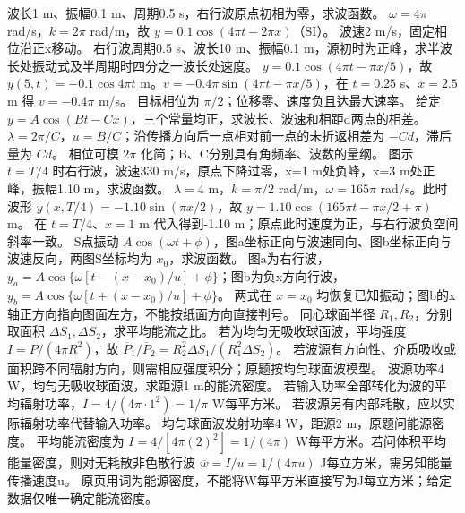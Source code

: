 \problemtext 波长1 m、振幅0.1 m、周期0.5 s，右行波原点初相为零，求波函数。
\workings $\omega=4\pi$ rad/s，$k=2\pi$ rad/m，故 $y=0.1\cos(4\pi t-2\pi x)$（SI）。
\crosscheck 波速2 m/s，固定相位沿正x移动。
\problemtext 右行波周期0.5 s、波长10 m、振幅0.1 m，源初时为正峰，求半波长处振动式及半周期时四分之一波长处速度。
\workings $y=0.1\cos(4\pi t-\pi x/5)$，故 $y(5,t)=-0.1\cos4\pi t$ m。$v=-0.4\pi\sin(4\pi t-\pi x/5)$，在 $t=0.25$ s、$x=2.5$ m 得 $v=-0.4\pi$ m/s。
\crosscheck 目标相位为 $\pi/2$；位移零、速度负且达最大速率。
\problemtext 给定 $y=A\cos(Bt-Cx)$，三个常量均正，求波长、波速和相距d两点的相差。
\workings $\lambda=2\pi/C$，$u=B/C$；沿传播方向后一点相对前一点的未折返相差为 $-Cd$，滞后量为 $Cd$。
\crosscheck 相位可模 $2\pi$ 化简；B、C分别具有角频率、波数的量纲。
\problemtext 图示 $t=T/4$ 时右行波，波速330 m/s，原点下降过零，x=1 m处负峰，x=3 m处正峰，振幅1.10 m，求波函数。
\workings $\lambda=4$ m，$k=\pi/2$ rad/m，$\omega=165\pi$ rad/s。此时波形 $y(x,T/4)=-1.10\sin(\pi x/2)$，故 $y=1.10\cos(165\pi t-\pi x/2+\pi)$ m。
\crosscheck 在 $t=T/4$、$x=1$ m 代入得到-1.10 m；原点此时速度为正，与右行波负空间斜率一致。
\problemtext S点振动 $A\cos(\omega t+\phi)$，图a坐标正向与波速同向、图b坐标正向与波速反向，两图S坐标均为 $x_0$，求波函数。
\workings 图a为右行波，$y_a=A\cos\{\omega[t-(x-x_0)/u]+\phi\}$；图b为负x方向行波，$y_b=A\cos\{\omega[t+(x-x_0)/u]+\phi\}$。
\crosscheck 两式在 $x=x_0$ 均恢复已知振动；图b的x轴正方向指向图面左方，不能按纸面方向直接判号。
\problemtext 同心球面半径 $R_1,R_2$，分别取面积 $\Delta S_1,\Delta S_2$，求平均能流之比。
\workings 若为均匀无吸收球面波，平均强度 $I=P/(4\pi R^2)$，故 $\overline P_1/\overline P_2=R_2^2\Delta S_1/(R_1^2\Delta S_2)$。
\crosscheck 若波源有方向性、介质吸收或面积跨不同辐射方向，则需相应强度积分；原题按均匀球面波模型。
\problemtext 波源功率4 W，均匀无吸收球面波，求距源1 m的能流密度。
\workings 若输入功率全部转化为波的平均辐射功率，$I=4/(4\pi\cdot1^2)=1/\pi$ W每平方米。
\crosscheck 若波源另有内部耗散，应以实际辐射功率代替输入功率。
\problemtext 均匀球面波发射功率4 W，距源2 m，原题问能源密度。
\workings 平均能流密度为 $I=4/[4\pi(2)^2]=1/(4\pi)$ W每平方米。若问体积平均能量密度，则对无耗散非色散行波 $\overline w=I/u=1/(4\pi u)$ J每立方米，需另知能量传播速度u。
\crosscheck 原页用词为能源密度，不能将W每平方米直接写为J每立方米；给定数据仅唯一确定能流密度。

